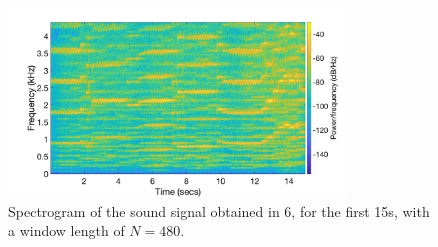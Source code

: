 \documentclass[a4paper, oneside, 11pt]{article}
\begin{document}
\begin{figure}[h!]
	\centering
	\includegraphics[width=0.8\textwidth]{figures/spect_6.png}
	\caption{Spectrogram of the sound signal obtained in 6, for the first 15s, with a window length of $N = 480$.}
	\label{fig:spect_6}
\end{figure}
\end{document}

